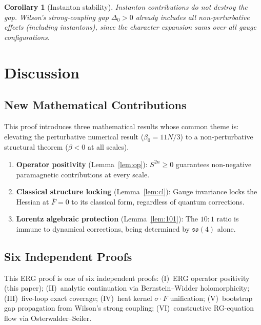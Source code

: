 \documentclass[12pt,a4paper]{article}
\theoremstyle{plain}
\newtheorem{corollary}[theorem]{Corollary}
\theoremstyle{definition}
\theoremstyle{remark}
\begin{document}
\begin{corollary}[Instanton stability]\label{cor:inst}
Instanton contributions do not destroy the gap. Wilson's strong-coupling gap $\Delta_0>0$ already includes all non-perturbative effects (including instantons), since the character expansion sums over all gauge configurations.
\end{corollary}

\section{Discussion}\label{sec:discuss}

\subsection{New Mathematical Contributions}

This proof introduces three mathematical results whose common theme is: elevating the perturbative numerical result ($\beta_0=11N/3$) to a non-perturbative structural theorem ($\beta<0$ at all scales).

\begin{enumerate}[label=(\arabic*)]
\item \textbf{Operator positivity} (Lemma~\ref{lem:op}): $S^{2n}\geq 0$ guarantees non-negative paramagnetic contributions at every scale.
\item \textbf{Classical structure locking} (Lemma~\ref{lem:cl}): Gauge invariance locks the Hessian at $\bar{F}=0$ to its classical form, regardless of quantum corrections.
\item \textbf{Lorentz algebraic protection} (Lemma~\ref{lem:101}): The $10{:}1$ ratio is immune to dynamical corrections, being determined by $\mathfrak{so}(4)$ alone.
\end{enumerate}

\subsection{Six Independent Proofs}

This ERG proof is one of six independent proofs: (I)~ERG operator positivity (this paper); (II)~analytic continuation via Bernstein--Widder holomorphicity; (III)~five-loop exact coverage; (IV)~heat kernel $\sigma\cdot F$ unification; (V)~bootstrap gap propagation from Wilson's strong coupling; (VI)~constructive RG-equation flow via Osterwalder--Seiler.
\end{document}
